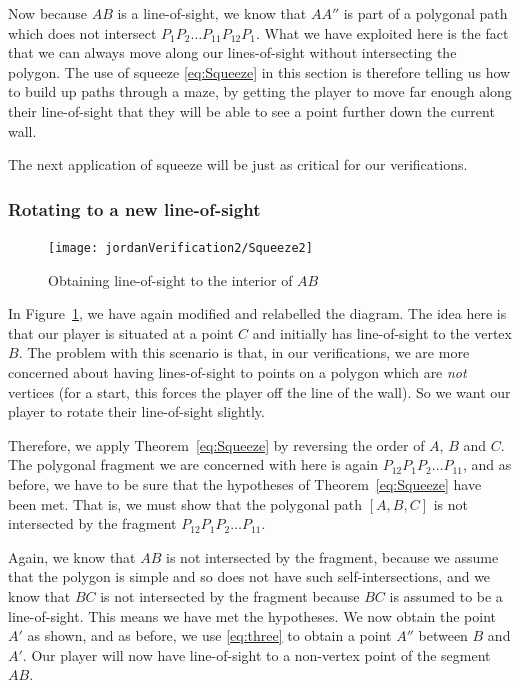 Now because $AB$ is a line-of-sight, we know that $AA''$ is part of a polygonal path which does not intersect $P_1P_2\ldots P_{11}P_{12}P_{1}$. What we have exploited here is the fact that we can always move along our lines-of-sight without intersecting the polygon. The use of squeeze \eqref{eq:Squeeze} in this section is therefore telling us how to build up paths through a maze, by getting the player to move far enough along their line-of-sight that they will be able to see a point further down the current wall. 

The next application of squeeze will be just as critical for our verifications.

\subsubsection{Rotating to a new line-of-sight}\label{sec:RotateToNew}
\begin{figure}
\centering\texttt{[image: jordanVerification2/Squeeze2]}
\caption{Obtaining line-of-sight to the interior of $AB$}
\label{fig:Squeeze2}
\end{figure}
In Figure~\ref{fig:Squeeze2}, we have again modified and relabelled the diagram. The idea here is that our player is situated at a point $C$ and initially has line-of-sight to the vertex $B$. The problem with this scenario is that, in our verifications, we are more concerned about having lines-of-sight to points on a polygon which are \emph{not} vertices (for a start, this forces the player off the line of the wall).  So we want our player to rotate their line-of-sight slightly. 

Therefore, we apply Theorem~\ref{eq:Squeeze} by reversing the order of $A$, $B$ and $C$. The polygonal fragment we are concerned with here is again $P_{12}P_1P_2\ldots P_{11}$, and as before, we have to be sure that the hypotheses of Theorem~\ref{eq:Squeeze} have been met. That is, we must show that the polygonal path $[A,B,C]$ is not intersected by the fragment $P_{12}P_1P_2\ldots P_{11}$. 

Again, we know that $AB$ is not intersected by the fragment, because we assume that the polygon is simple and so does not have such self-intersections, and we know that $BC$ is not intersected by the fragment because $BC$ is assumed to be a line-of-sight. This means we have met the hypotheses. We now obtain the point $A'$ as shown, and as before, we use \ref{eq:three} to obtain a point $A''$ between $B$ and $A'$. Our player will now have line-of-sight to a non-vertex point of the segment $AB$.

